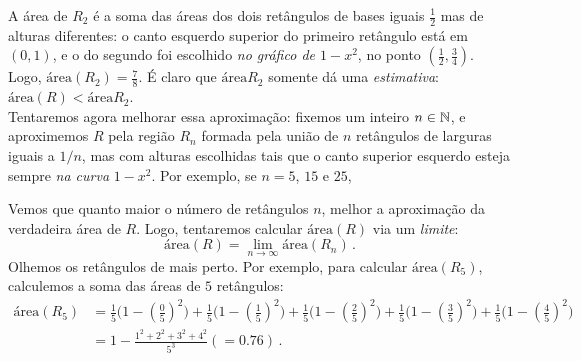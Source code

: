 A área de $R_2$ é a soma das áreas dos dois retângulos de bases
iguais $\tfrac12$ mas de alturas diferentes: 
o canto esquerdo superior do primeiro retângulo está em $(0,1)$, e o do segundo
foi escolhido \emph{no gráfico de $1-x^2$}, no ponto $(\tfrac12,\tfrac34)$.
Logo, $\text{área}(R_2)=\tfrac78$.
É claro que $\text{área}R_2$ somente dá uma \emph{estimativa}:
$\text{área}(R)<\text{área}R_2$.\\

Tentaremos agora melhorar 
essa aproximação: fixemos um inteiro $n\in \mathbb{N}$, e
aproximemos
$R$ pela região $R_n$ formada pela união de $n$ retângulos de larguras iguais a
$1/n$, mas com alturas 
escolhidas tais que o canto superior esquerdo esteja sempre \emph{na curva}
$1-x^2$. Por exemplo, 
se $n=5$, ${15}$ e ${25}$,

\begin{center}
\begin{bmlimage}\end{bmlimage}
\end{center}

Vemos que quanto maior o número de retângulos $n$, melhor a aproximação da
verdadeira área de $R$.
Logo, tentaremos calcular $\text{área}(R)$ via um \emph{limite}:
$$\text{área}(R)=\lim_{n\to \infty}\text{área}(R_n)\,.$$
Olhemos os retângulos de mais perto. Por exemplo, para calcular
$\text{área}(R_5)$, calculemos a soma das áreas de $5$ retângulos:
\begin{align*}
\text{área}(R_5)&=\tfrac15\big(1-(\tfrac{0}{5})^2)
+\tfrac15\big(1-(\tfrac{1}{5})^2)
+\tfrac15\big(1-(\tfrac{2}{5})^2)
+\tfrac15\big(1-(\tfrac{3}{5})^2)
+\tfrac15\big(1-(\tfrac{4}{5})^2)\\
&=1-\tfrac{1^2+2^2+3^2+4^2}{5^3}(=0.76)\,.
\end{align*}

